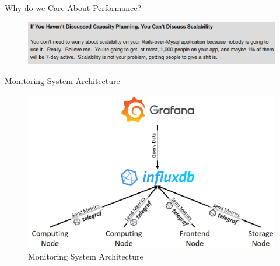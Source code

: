 \documentclass[compress,aspectratio=169]{beamer}
\begin{document}
\begin{frame}{Why do we Care About Performance?}
\begin{center}
\begin{figure}
  \includegraphics[width=\textwidth]{assets/scalefoot.png}
  \caption{\cite{ScaleFoot}}
\end{figure}
\end{center}
\end{frame}

\begin{frame}{Monitoring System Architecture}
\begin{center}
\begin{figure}
  \includegraphics[height=.8\textheight]{assets/monitoring_system_architecture.png}
  \caption{Monitoring System Architecture}
\end{figure}
\end{center}
\end{frame}
\end{document}
